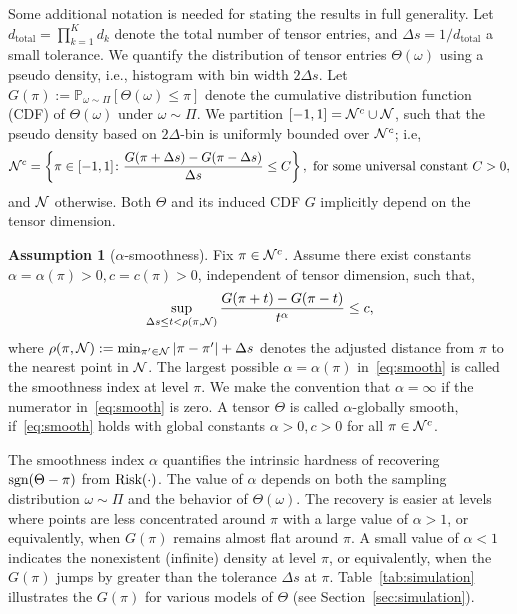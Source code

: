 \documentclass{article}
\theoremstyle{plain}
\theoremstyle{definition}
\newtheorem{assumption}{Assumption}
\def\sign{\textup{sgn}}
\def\risk{\textup{Risk}}
\begin{document}
Some additional notation is needed for stating the results in full generality. Let $d_\text{total}=\prod_{k=1}^K d_k$ denote the total number of tensor entries, and $\Delta s = 1/d_\text{total}$ a small tolerance. We quantify the distribution of tensor entries $\Theta(\omega)$ using a pseudo density, i.e., histogram with bin width $2\Delta s$. Let $G(\pi):=\mathbb{P}_{\omega\sim \Pi}[\Theta(\omega)\leq \pi]$ denote the cumulative distribution function (CDF) of $\Theta(\omega)$ under $\omega\sim \Pi$. We partition $[-1,1]=\mathcal{N}^c \cup \mathcal{N}$, such that the pseudo density based on $2\Delta$-bin is uniformly bounded over $\mathcal{N}^c$; i.e,
\[
\tN^c=\left\{\pi\in[-1,1] \colon {G(\pi+{\Delta s})-G(\pi-{\Delta s})\over \Delta s} \leq C \right\},\ \text{for some universal constant $C>0$},
\]
and $\mathcal{N}$ otherwise. Both $\Theta$ and its induced CDF $G$ implicitly depend on the tensor dimension. 

\begin{assumption}[$\alpha$-smoothness]\label{ass:margin} Fix $\pi \in\mathcal{N}^c$. Assume there exist constants $\alpha=\alpha(\pi)> 0, c=c(\pi) >0$, independent of tensor dimension, such that, 
\begin{equation}\label{eq:smooth}
\sup_{\Delta s \leq t<\rho(\pi, \mathcal{N})}{G(\pi+{t})-G(\pi-{t})\over t^\alpha} \leq c,
\end{equation}
where $\rho(\pi,\mathcal{N}):=\min_{\pi'\in \mathcal{N}}|\pi-\pi'|+\Delta s$ denotes the adjusted distance from $\pi$ to the nearest point in $\mathcal{N}$. The largest possible $\alpha=\alpha(\pi)$ in~\eqref{eq:smooth} is called the smoothness index at level $\pi$. We make the convention that $\alpha=\infty$ if the numerator in~\eqref{eq:smooth} is zero. A tensor $\Theta$ is called $\alpha$-globally smooth, if~\eqref{eq:smooth} holds with global constants $\alpha>0, c>0$ for all $\pi\in\mathcal{N}^c$. 
\end{assumption}

The smoothness index $\alpha$ quantifies the intrinsic hardness of recovering $\sign(\Theta-\pi)$ from $\risk(\cdot)$. 
The value of $\alpha$ depends on both the sampling distribution $\omega\sim \Pi$ and the behavior of $\Theta(\omega)$. 
The recovery is easier at levels where points are less concentrated around $\pi$ with a large value of $\alpha>1$, or equivalently, when $G(\pi)$ remains almost  flat around $\pi$. A small value of $\alpha<1$ indicates the nonexistent (infinite) density at level $\pi$, or equivalently, when the $G(\pi)$ jumps by greater than the tolerance $\Delta s$ at $\pi$. Table~\ref{tab:simulation} illustrates the $G(\pi)$ for various models of $\Theta$ (see Section~\ref{sec:simulation}). 
\end{document}
